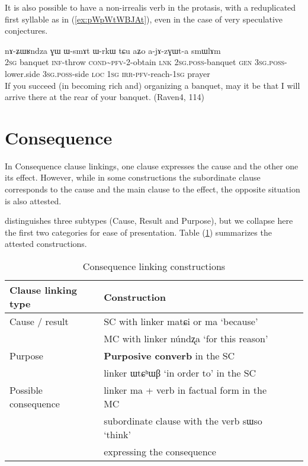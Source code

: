 \documentclass[oldfontcommands,oneside,a4paper,11pt]{article}
\newcommand{\ipa}[1]{{\phon \mbox{#1}}} %
\newcommand{\refb}[1]{(\ref{#1})}
\begin{document}
 
 It is also possible to have a non-irrealis verb in the protasis, with a reduplicated first syllable as in \refb{ex:pWpWtWBJAt}, even in the case of very speculative conjectures.
\begin{exe}
\ex \label{ex:pWpWtWBJAt}
\gll 
[\ipa{nɤʑo}  	\ipa{ʑɯʁndza}  	\ipa{kɤ-lɤt}  	\textbf{\ipa{pɯ\textasciitilde{}pɯ-tɯ-βɟɤt}}]  	\ipa{nɤ,}  	\ipa{nɤ-ʑɯʁndza}  	\ipa{ɣɯ}  	\ipa{ɯ-smɤt}  	\ipa{ɯ-rkɯ}  	\ipa{tɕu}  	\ipa{aʑo}  	\ipa{a-jɤ-zɣɯt-a}  	\ipa{smɯlɤm}  \\
\textsc{2sg} banquet \textsc{inf}-throw \textsc{cond\textasciitilde{}pfv}-2-obtain \textsc{lnk} \textsc{2sg.poss}-banquet \textsc{gen} \textsc{3sg.poss}-lower.side \textsc{3sg.poss}-side \textsc{loc} \textsc{1sg} \textsc{irr-pfv}-reach-\textsc{1sg} prayer \\
\glt  If you succeed (in becoming rich and) organizing a banquet, may it be that I will arrive there at the rear of your banquet. (Raven4, 114)
\end{exe} 


\section{Consequence}
In Consequence clause linkings, one clause expresses the cause and the other one its effect. However, while in some constructions the subordinate clause corresponds to the cause and the main clause to the effect, the opposite situation is also attested.  

\citet[17, 44]{dixon09intro} distinguishes three subtypes (Cause, Result and Purpose), but we collapse here the first two categories for ease  of presentation. Table \refb{tab:consequence} summarizes the attested constructions.


\begin{table}[h]
\caption{Consequence linking constructions} \label{tab:consequence}
\begin{tabular}{lllll}
\toprule
 Clause linking type &Construction \\
\midrule
 Cause / result & SC with linker \ipa{matɕi} or \ipa{ma} `because'\\
 & MC with linker \ipa{núndʐa} `for this reason' \\
 \midrule
Purpose & \textbf{Purposive converb} in the SC\\
& linker \ipa{ɯtɕʰɯβ} `in order to' in the SC\\
 \midrule
Possible consequence &  linker   \ipa{ma} + verb in factual form in the MC \\
& subordinate clause with the verb \ipa{sɯso} `think' \\
&expressing the consequence\\
\bottomrule
\end{tabular}
\end{table}
\end{document}
